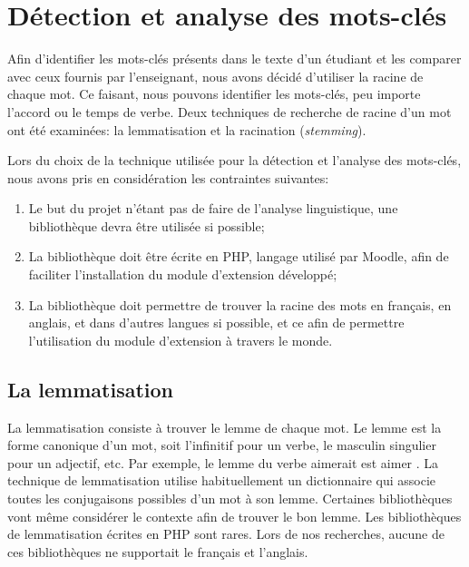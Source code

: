 \chapter{D\'etection et analyse des mots-cl\'es}
\label{chap:keywords}
Afin d'identifier les mots-cl\'es pr\'esents dans le texte d'un \'etudiant et les comparer avec ceux fournis par l'enseignant, nous avons d\'ecid\'e d'utiliser la racine de chaque mot.
Ce faisant, nous pouvons identifier les mots-cl\'es, peu importe l'accord ou le temps de verbe.
Deux techniques de recherche de racine d'un mot ont \'et\'e examin\'ees: la lemmatisation et la racination (\textit{stemming}).

Lors du choix de la technique utilis\'ee pour la d\'etection et l'analyse des mots-cl\'es, nous avons pris en consid\'eration les contraintes suivantes:
\begin{enumerate}
  \item Le but du projet n'\'etant pas de faire de l'analyse linguistique, une biblioth\`eque devra \^etre utilis\'ee si possible;
  \item La biblioth\`eque doit \^etre \'ecrite en PHP, langage utilis\'e par Moodle, afin de faciliter l'installation du module d'extension d\'evelopp\'e;
  \item La biblioth\`eque doit permettre de trouver la racine des mots en fran\c{c}ais, en anglais, et dans d'autres langues si possible, et ce afin de permettre l'utilisation du module d'extension \`a travers le monde.
\end{enumerate}

\section{La lemmatisation}
La lemmatisation consiste \`a trouver le lemme de chaque mot.
Le lemme est la forme canonique d'un mot, soit l'infinitif pour un verbe, le masculin singulier pour un adjectif, etc.
Par exemple, le lemme du verbe \og aimerait \fg{} est \og aimer \fg{}.
La  technique de lemmatisation utilise habituellement un dictionnaire qui associe toutes les conjugaisons possibles d'un mot \`a son lemme.
Certaines biblioth\`eques vont m\^eme consid\'erer le contexte afin de trouver le bon lemme.
Les biblioth\`eques de lemmatisation \'ecrites en PHP sont rares.
Lors de nos recherches, aucune de ces biblioth\`eques ne supportait le fran\c{c}ais et l'anglais.

